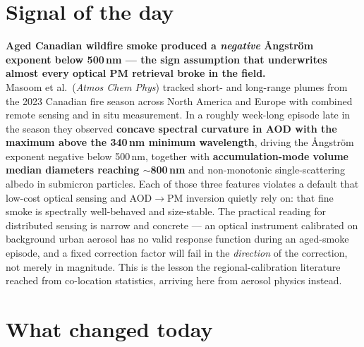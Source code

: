 \documentclass[10pt]{article}
\begin{document}
\vspace{6mm}

\section*{\sffamily\bfseries\color{Deep}Signal of the day}
\vspace{-1.5mm}{\color{Amber}\rule{\linewidth}{1.1pt}}\vspace{2.5mm}

\begin{keybox}
{\sffamily\bfseries\small\color{Deep}Aged Canadian wildfire smoke produced a
\emph{negative} \AA ngstr\"om exponent below 500\,nm --- the sign assumption that
underwrites almost every optical PM retrieval broke in the field.}\\[1.4mm]
\footnotesize
Masoom et al.\ (\textit{Atmos Chem Phys}) tracked short- and long-range plumes from the
2023 Canadian fire season across North America and Europe with combined remote sensing
and in situ measurement. In a roughly week-long episode late in the season they observed
\textbf{concave spectral curvature in AOD with the maximum above the 340\,nm minimum
wavelength}, driving the \AA ngstr\"om exponent negative below 500\,nm, together with
\textbf{accumulation-mode volume median diameters reaching $\sim$800\,nm} and
non-monotonic single-scattering albedo in submicron particles. Each of those three
features violates a default that low-cost optical sensing and AOD$\rightarrow$PM inversion
quietly rely on: that fine smoke is spectrally well-behaved and size-stable. The
practical reading for distributed sensing is narrow and concrete --- an optical instrument
calibrated on background urban aerosol has no valid response function during an
aged-smoke episode, and a fixed correction factor will fail in the \emph{direction} of
the correction, not merely in magnitude. This is the lesson the regional-calibration
literature reached from co-location statistics, arriving here from aerosol physics
instead.
\end{keybox}

\vspace{3mm}

\section*{\sffamily\bfseries\color{Deep}What changed today}
\vspace{-1.5mm}{\color{Amber}\rule{\linewidth}{1.1pt}}\vspace{2.5mm}
\end{document}
